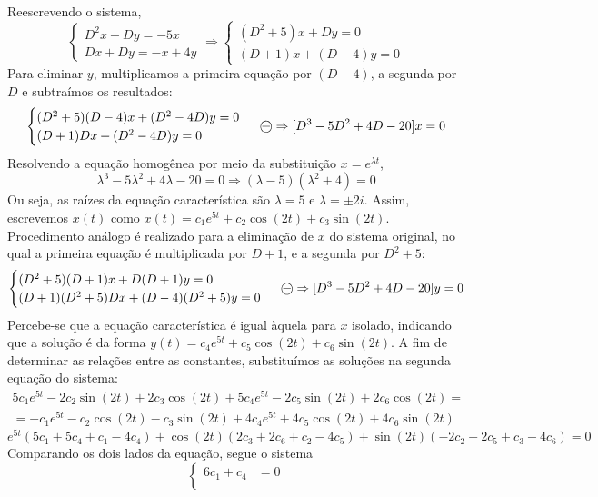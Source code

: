 \documentclass[oneside,12pt,a4paper]{report}
\begin{document}
    \begin{resolucao}
        \itemresolucao Reescrevendo o sistema,
        \[\begin{cases}
            D^2x+Dy=-5x\\
            Dx+Dy=-x+4y
        \end{cases}\Rightarrow
        \begin{cases}
            (D^2+5)x+Dy=0\\
            (D+1)x+(D-4)y=0
        \end{cases}\]
        Para eliminar $y$, multiplicamos a primeira equação por $(D-4)$, a segunda por $D$ e subtraímos os resultados:
        \[\begin{cases}
            (D^2+5)(D-4)x+(D^2-4D)y=0\\
            (D+1)Dx+(D^2-4D)y=0
        \end{cases}~\text{\textcircled{$-$}}\Rightarrow [D^3-5D^2+4D-20]x=0\]
        Resolvendo a equação homogênea por meio da substituição $x=e^{\lambda t}$,
        \[\lambda^3-5\lambda^2+4\lambda-20=0\Rightarrow(\lambda-5)(\lambda^2+4)=0\]
        Ou seja, as raízes da equação característica são $\lambda=5$ e $\lambda=\pm2i$. Assim, escrevemos $x(t)$ como $x(t)=c_1e^{5t}+c_2\cos(2t)+c_3\sin(2t)$. Procedimento análogo é realizado para a eliminação de $x$ do sistema original, no qual a primeira equação é multiplicada por $D+1$, e a segunda por $D^2+5$:
        \[\begin{cases}
            (D^2+5)(D+1)x+D(D+1)y=0\\
            (D+1)(D^2+5)Dx+(D-4)(D^2+5)y=0
        \end{cases}~\text{\textcircled{$-$}}\Rightarrow [D^3-5D^2+4D-20]y=0\]
        Percebe-se que a equação característica é igual àquela para $x$ isolado, indicando que a solução é da forma $y(t)=c_4e^{5t}+c_5\cos(2t)+c_6\sin(2t)$. A fim de determinar as relações entre as constantes, substituímos as soluções na segunda equação do sistema:
        \begin{align*}5c_1e^{5t}-2c_2\sin(2t)+2c_3\cos(2t)+5c_4e^{5t}-2c_5\sin(2t)+2c_6\cos(2t)=\\
        =-c_1e^{5t}-c_2\cos(2t)-c_3\sin(2t)+4c_4e^{5t}+4c_5\cos(2t)+4c_6\sin(2t)
        \end{align*}
        \[e^{5t}(5c_1+5c_4+c_1-4c_4)+\cos(2t)(2c_3+2c_6+c_2-4c_5)+\sin(2t)(-2c_2-2c_5+c_3-4c_6)=0\]
        Comparando os dois lados da equação, segue o sistema
        \[\begin{cases}
            6c_1+c_4&=0\\

\end{cases}\]
\end{resolucao}
\end{document}
